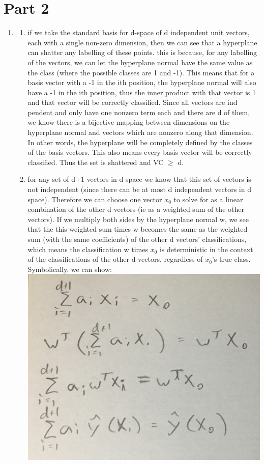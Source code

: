 \documentclass{article}
\begin{document}
\section{Part 2}
\begin{enumerate}
\item 

\begin{enumerate}
\item if we take the standard basis for d-space of d independent unit vectors, each with a single non-zero dimension, then we can see that a hyperplane can shatter any labelling of these points. this is because, for any labelling of the vectors, we can let the hyperplane normal have the same value as the class (where the possible classes are 1 and -1). This means that for a basis vector with a -1 in the ith position, the hyperplane normal will also have a -1 in the ith position, thus the inner product with that vector is 1 and that vector will be correctly classified.  Since all vectors are ind pendent and only have one nonzero term each and there are d of them, we know there is a bijective mapping between dimensions on the hyperplane normal and vectors which are nonzero along that dimension. In other words, the hyperplane will be completely defined by the classes of the basis vectors. This also means every basis vector will be correctly classified. Thus the set is shattered and VC $\geq$ d.\\
\item for any set of d+1 vectors in d space we know that this set of vectors is not independent (since there can be at most d independent vectors in d space). Therefore we can choose one vector $x_0$ to solve for as a linear combination of the other d vectors (ie as a weighted sum of the other vectors). If we multiply both sides by the hyperplane normal w, we see that the this weighted sum times w becomes the same as the weighted sum (with the same coefficients) of the other d vectors' classifications, which means the classification w times $x_0$ is deterministic in the context of the classifications of the other d vectors, regardless of $x_0$'s true class. Symbolically, we can show: \\
\includegraphics[scale=.1]{IMG_3685.JPG}\\

\end{enumerate}
\end{enumerate}
\end{document}

